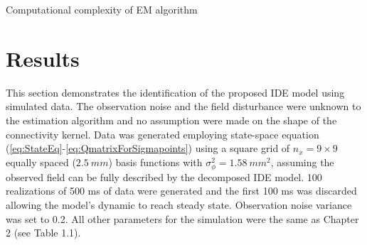 \documentclass[]{article}
\begin{document}
 \begin {table}
\begin{center}
 \caption {Computational complexity of EM algorithm} 
\label{table:ComputationalComplexity}
\end{center}
\end {table}
\section{Results}
This section demonstrates the identification of the proposed IDE model using simulated data. The observation noise and the field disturbance were unknown to the estimation algorithm and no assumption were made on the shape of the connectivity kernel. Data was generated employing state-space equation (\ref{eq:StateEq}-\ref{eq:QmatrixForSigmapoints}) using a square grid of $n_x= 9 \times 9$ equally spaced ($2.5~mm$) basis functions with $\sigma_{\phi}^2=1.58~mm^2$, assuming the observed field can be fully described by the decomposed IDE model. 100 realizations of 500 ms of data were generated and the first 100 ms was discarded allowing the model's dynamic to reach steady state. Observation noise variance was set to 0.2. All other parameters for the simulation were the same as Chapter 2 (see Table 1.1).
\end{document}
